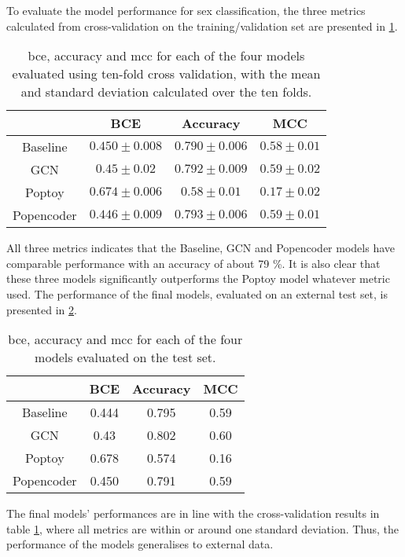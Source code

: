 To evaluate the model performance for sex classification, the three metrics calculated from cross-validation on the training/validation set are presented in \ref{tab:sex_model_results}.
\begin{table}[!htbp]
    \centering
    \caption{\acrfull{bce}, accuracy and \acrfull{mcc} for each of the four models evaluated using ten-fold cross validation, with the mean and standard deviation calculated over the ten folds.}    
    \begin{tabular}{c|c|c|c}
         & BCE & Accuracy & MCC\\ \hline
        Baseline & $0.450\pm0.008$ & $0.790\pm0.006$ &$0.58\pm 0.01$\\
        GCN &$0.45\pm0.02$ & $0.792\pm0.009$& $0.59\pm0.02$\\
        Poptoy &$0.674\pm 0.006$ & $0.58\pm0.01$ &$0.17\pm0.02$\\
        Popencoder &$0.446\pm0.009$& $0.793\pm 0.006$ & $0.59\pm0.01$\\
    \end{tabular}
    \label{tab:sex_model_results}
\end{table}
All three metrics indicates that the Baseline, GCN and Popencoder models have comparable performance with an accuracy of about 79 \%. It is also clear that these three models significantly outperforms the Poptoy model whatever metric used. The performance of the final models, evaluated on an external test set, is presented in \ref{tab:sex_final_model_results}.
\begin{table}[!htbp]
    \centering
    \caption{\acrfull{bce}, accuracy and \acrfull{mcc} for each of the four models evaluated on the test set.}
    \begin{tabular}{c|c|c|c}
         & BCE & Accuracy & MCC\\ \hline
        Baseline & 0.444 & 0.795 &0.59\\
        GCN & 0.43& 0.802 & 0.60 \\
        Poptoy &0.678 &0.574 &0.16\\
        Popencoder & 0.450 & 0.791& 0.59\\
    \end{tabular}
    \label{tab:sex_final_model_results}
\end{table}
The final models' performances are in line with the cross-validation results in table \ref{tab:sex_model_results}, where all metrics are within or around one standard deviation. Thus, the performance of the models generalises to external data.


